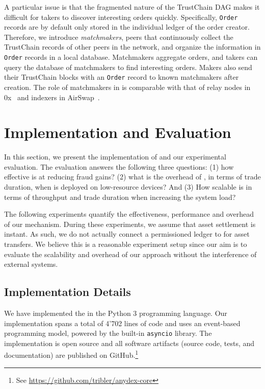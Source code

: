 A particular issue is that the fragmented nature of the TrustChain DAG makes it difficult for takers to discover interesting orders quickly.
Specifically, \texttt{Order} records are by default only stored in the individual ledger of the order creator.
Therefore, we introduce \emph{matchmakers}, peers that continuously collect the TrustChain records of other peers in the network, and organize the information in \texttt{Order} records in a local database.
Matchmakers aggregate orders, and takers can query the database of matchmakers to find interesting orders.
Makers also send their TrustChain blocks with an \texttt{Order} record to known matchmakers after creation.
The role of matchmakers in \ModelName{} is comparable with that of relay nodes in 0x~\cite{warren20170x} and indexers in AirSwap~\cite{airswap}.

\section{Implementation and Evaluation}
\label{sec:evaluation}
In this section, we present the implementation of \ModelName{} and our experimental evaluation.
The evaluation answers the following three questions: (1) how effective is \ModelName{} at reducing fraud gains? (2) what is the overhead of \ModelName{}, in terms of trade duration, when \ModelName{} is deployed on low-resource devices? And (3) How scalable is \ModelName{} in terms of throughput and trade duration when increasing the system load?

The following experiments quantify the effectiveness, performance and overhead of our \ModelName{} mechanism.
During these experiments, we assume that asset settlement is instant.
As such, we do not actually connect a permissioned ledger to \ModelName{} for asset transfers.
We believe this is a reasonable experiment setup since our aim is to evaluate the scalability and overhead of our approach without the interference of external systems.

\subsection{Implementation Details}
\label{sec:implementation}
We have implemented the \ModelName{} in the Python 3 programming language.
Our implementation spans a total of 4'702 lines of code and uses an event-based programming model, powered by the built-in \texttt{asyncio} library.
The implementation is open source and all software artifacts (source code, tests, and documentation) are published on GitHub.\footnote{See \url{https://github.com/tribler/anydex-core}}

